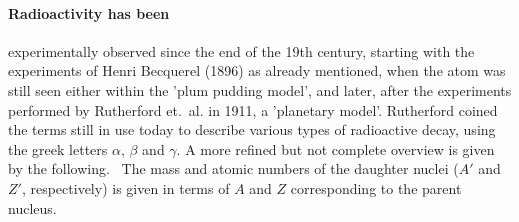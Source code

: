 \paragraph{Radioactivity has been}
experimentally observed since the end of the 19th century, 
starting with the experiments of Henri Becquerel (1896) as already mentioned, when the atom was still seen 
either within the 'plum pudding model', and later, after the experiments performed by 
Rutherford et.~al. in 1911, a 'planetary model'. Rutherford coined the terms still in 
use today to describe various types of radioactive decay, using the greek letters 
$\alpha$, $\beta$ and $\gamma$. A more refined but not complete overview is 
given by the following.~ \cite{martin2006nuclear}
The mass and atomic numbers of the daughter nuclei ($A'$ and $Z'$, respectively) 
is given in terms of $A$ and $Z$ corresponding to the parent nucleus. 
